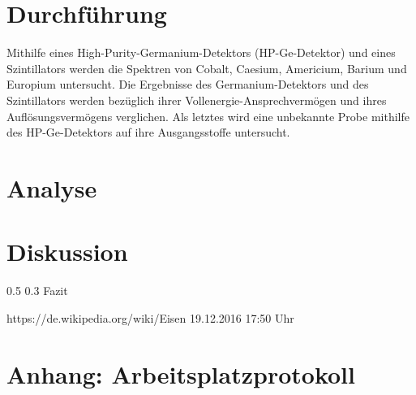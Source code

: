 \documentclass[german, %
parskip=full, %
bibliography=totoc, %
]{scrartcl}
\makeatletter
\renewcommand\subsection{\@startsection 
   {subsection}{2}{0mm}%
   {0.5\baselineskip}%
   {0.3\baselineskip}%
   {\bfseries\sffamily\large}%
   }
\makeatother
\begin{document}
\section{Durchführung}

Mithilfe eines High-Purity-Germanium-Detektors (HP-Ge-Detektor) und eines Szintillators werden die Spektren von Cobalt, Caesium, Americium, Barium und Europium untersucht. Die Ergebnisse des Germanium-Detektors und des Szintillators werden bezüglich ihrer Vollenergie-Ansprechvermögen und ihres Auflösungsvermögens verglichen. Als letztes wird eine unbekannte Probe mithilfe des HP-Ge-Detektors auf ihre Ausgangsstoffe untersucht. 

\section{Analyse}



\section{Diskussion}



\subsection{Fazit}




\begin{thebibliography}{9}

  https://de.wikipedia.org/wiki/Eisen
	19.12.2016
	17:50 Uhr

\end{thebibliography}

\section{Anhang: Arbeitsplatzprotokoll}
\end{document}
